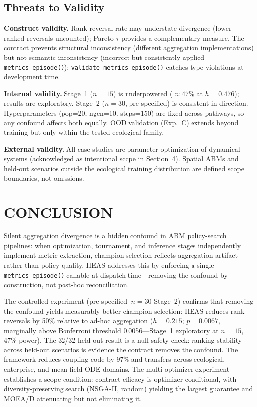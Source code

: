 \documentclass{wscpaperproc}
\begin{document}
\subsection{Threats to Validity}

\textbf{Construct validity.} Rank reversal rate may understate divergence
(lower-ranked reversals uncounted); Pareto $\tau$ provides a complementary
measure. The contract prevents structural inconsistency (different aggregation
implementations) but not semantic inconsistency (incorrect but consistently
applied \texttt{metrics\_episode()}); \texttt{validate\_metrics\_episode()}
catches type violations at development time.

\textbf{Internal validity.} Stage~1 ($n\!=\!15$) is underpowered ($\approx\!47\%$
at $h\!=\!0.476$); results are exploratory. Stage~2 ($n\!=\!30$, pre-specified)
is consistent in direction. Hyperparameters (pop=20, ngen=10, steps=150) are
fixed across pathways, so any confound affects both equally. OOD validation
(Exp.~C) extends beyond training but only within the tested ecological family.

\textbf{External validity.} All case studies are parameter optimization of
dynamical systems (acknowledged as intentional scope in Section~4). Spatial
ABMs and held-out scenarios outside the ecological training distribution are
defined scope boundaries, not omissions.

\section{CONCLUSION}

Silent aggregation divergence is a hidden confound in ABM policy-search
pipelines: when optimization, tournament, and inference stages independently
implement metric extraction, champion selection reflects aggregation artifact
rather than policy quality. HEAS addresses this by enforcing a single
\texttt{metrics\_episode()} callable at dispatch time---removing the confound by
construction, not post-hoc reconciliation.

The controlled experiment (pre-specified, $n\!=\!30$ Stage~2) confirms that
removing the confound yields measurably better champion selection: HEAS reduces
rank reversals by 50\% relative to ad-hoc aggregation ($h\!=\!0.215$;
$p\!=\!0.0067$, marginally above Bonferroni threshold 0.0056---Stage~1
exploratory at $n\!=\!15$, 47\% power). The 32/32 held-out result is a
null-safety check: ranking stability across held-out scenarios is evidence the
contract removes the confound. The framework reduces coupling code by 97\% and
transfers across ecological, enterprise, and mean-field ODE domains. The
multi-optimizer experiment establishes a scope condition: contract efficacy is
optimizer-conditional, with diversity-preserving search (NSGA-II, random)
yielding the largest guarantee and MOEA/D attenuating but not eliminating it.
\end{document}
